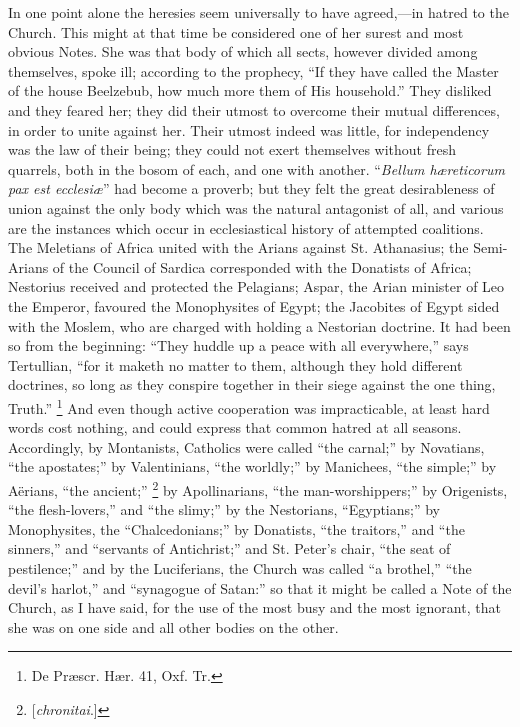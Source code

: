 In one point alone the heresies seem universally to
have agreed,—in hatred to the Church. This might at
that time be considered one of her surest and most
obvious Notes. She was that body of which all sects,
however divided among themselves, spoke ill; according to
the prophecy, ``If they have called the Master of the
house Beelzebub, how much more them of His
household.'' They disliked and they feared her; they
did their utmost to overcome their mutual differences, in
order to unite against her. Their utmost indeed was
little, for independency was the law of their being; they
could not exert themselves without fresh quarrels, both
in the bosom of each, and one with another. ``\emph{Bellum hæreticorum pax est
ecclesiæ}'' had become a
proverb; but they felt the great desirableness of union
against the only body which was the natural antagonist of
all, and various are the instances which occur in
ecclesiastical history of attempted coalitions. The
Meletians of Africa united with the Arians against St.
Athanasius; the Semi-Arians of the Council of Sardica
corresponded with the Donatists of Africa; Nestorius
received and protected the Pelagians; Aspar, the Arian
minister of Leo the Emperor, favoured the Monophysites of
Egypt; the Jacobites of Egypt sided with the Moslem, who
are charged with holding a Nestorian doctrine. It had
been so from the beginning: ``They huddle up a peace
with all everywhere,'' says Tertullian, ``for it
maketh no matter to them, although they hold different
doctrines, so long as they conspire together in their
siege against the one thing, Truth.'' \footnote{De Præscr. Hær. 41, Oxf. Tr.} And even
though active cooperation was impracticable, at least
hard words cost nothing, and could express that common
hatred at all seasons. Accordingly, by Montanists,
Catholics were called ``the carnal;'' by
Novatians, ``the apostates;'' by Valentinians,
``the worldly;'' by Manichees, ``the
simple;'' by Aërians, ``the ancient;'' \footnote{[\emph{chronitai}.]} by
Apollinarians, ``the man-worshippers;'' by
Origenists, ``the flesh-lovers,'' and ``the
slimy;'' by the Nestorians, ``Egyptians;'' by
Monophysites, the ``Chalcedonians;'' by
Donatists, ``the traitors,'' and ``the
sinners,'' and ``servants of Antichrist;''
and St. Peter's chair, ``the seat of
pestilence;'' and by the Luciferians, the Church was
called ``a brothel,'' ``the devil's
harlot,'' and ``synagogue of Satan:'' so that
it might be called a Note of the Church, as I have said,
for the use of the most busy and the most ignorant, that
she was on one side and all other bodies on the other.

